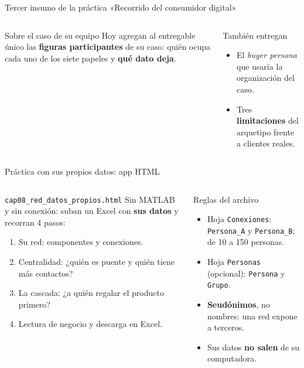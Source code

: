 \documentclass[aspectratio=169,xcolor=dvipsnames]{beamer}
\begin{document}
\begin{frame}{Tercer insumo de la práctica «Recorrido del consumidor digital»}
\begin{columns}[T]
  \begin{block}{Sobre el caso de su equipo}
    \small Hoy agregan al entregable único las \textbf{figuras participantes} de su caso: quién ocupa cada uno de los siete papeles y \textbf{qué dato deja}.
  \end{block}
  \begin{exampleblock}{También entregan}
    \scriptsize
    \begin{itemize}
      \item El \textit{buyer persona} que usaría la organización del caso.
      \item Tres \textbf{limitaciones} del arquetipo frente a clientes reales.
    \end{itemize}
  \end{exampleblock}
\end{columns}
\end{frame}

\begin{frame}{Práctica con sus propios datos: app HTML}
\begin{columns}[T]
  \begin{block}{\texttt{cap08\_red\_datos\_propios.html}}
    \small Sin MATLAB y sin conexión: suban un Excel con \textbf{sus datos} y recorran 4 pasos:
    \scriptsize
    \begin{enumerate}
      \item Su red: componentes y conexiones.
      \item Centralidad: ¿quién es puente y quién tiene más contactos?
      \item La cascada: ¿a quién regalar el producto primero?
      \item Lectura de negocio y descarga en Excel.
    \end{enumerate}
  \end{block}
  \begin{exampleblock}{Reglas del archivo}
    \scriptsize
    \begin{itemize}
      \item Hoja \texttt{Conexiones}: \texttt{Persona\_A} y \texttt{Persona\_B}; de 10 a 150 personas.
      \item Hoja \texttt{Personas} (opcional): \texttt{Persona} y \texttt{Grupo}.
      \item \textbf{Seudónimos}, no nombres: una red expone a terceros.
      \item Sus datos \textbf{no salen} de su computadora.
    \end{itemize}
  \end{exampleblock}
\end{columns}
\end{frame}
\end{document}
